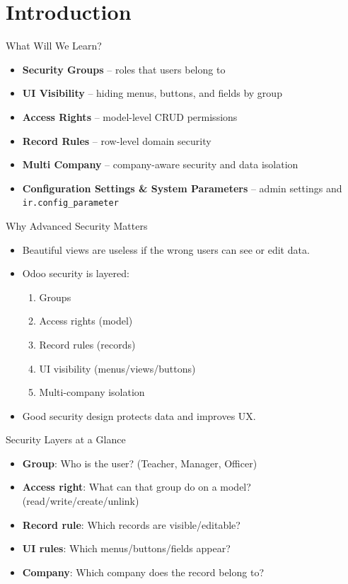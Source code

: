 \section{Introduction}

\begin{frame}{What Will We Learn?}
	\begin{itemize}
		\item \textbf{Security Groups} -- roles that users belong to
		\item \textbf{UI Visibility} -- hiding menus, buttons, and fields by group
		\item \textbf{Access Rights} -- model-level CRUD permissions
		\item \textbf{Record Rules} -- row-level domain security
		\item \textbf{Multi Company} -- company-aware security and data isolation
		\item \textbf{Configuration Settings \& System Parameters} -- admin settings and \texttt{ir.config\_parameter}
	\end{itemize}
\end{frame}

\begin{frame}{Why Advanced Security Matters}
	\begin{itemize}
		\item Beautiful views are useless if the wrong users can see or edit data.
		\item Odoo security is layered:
		\begin{enumerate}
			\item Groups
			\item Access rights (model)
			\item Record rules (records)
			\item UI visibility (menus/views/buttons)
			\item Multi-company isolation
		\end{enumerate}
		\item Good security design protects data and improves UX.
	\end{itemize}
\end{frame}

\begin{frame}{Security Layers at a Glance}
	\begin{itemize}
		\item \textbf{Group}: Who is the user? (Teacher, Manager, Officer)
		\item \textbf{Access right}: What can that group do on a model? (read/write/create/unlink)
		\item \textbf{Record rule}: Which records are visible/editable?
		\item \textbf{UI rules}: Which menus/buttons/fields appear?
		\item \textbf{Company}: Which company does the record belong to?
	\end{itemize}
\end{frame}
